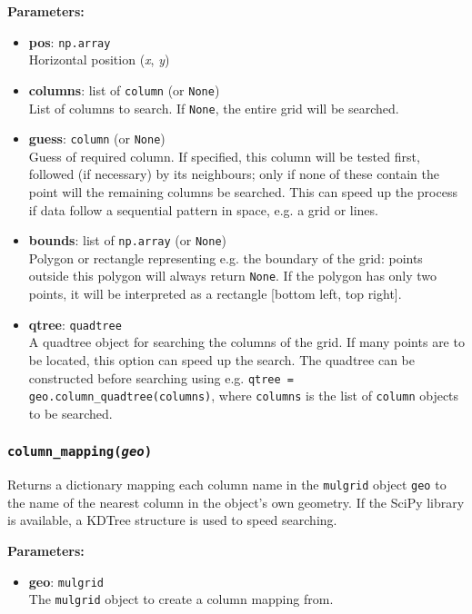 \textbf{Parameters:}
\begin{itemize}
\item \textbf{pos}: \texttt{np.array}\\
  Horizontal position (\emph{x}, \emph{y})
\item \textbf{columns}: list of \texttt{column} (or \texttt{None})\\
  List of columns to search.  If \texttt{None}, the entire grid will be searched.
\item \textbf{guess}: \texttt{column} (or \texttt{None})\\
  Guess of required column.  If specified, this column will be tested first, followed (if necessary) by its neighbours; only if none of these contain the point will the remaining columns be searched.  This can speed up the process if data follow a sequential pattern in space, e.g. a grid or lines.
 \item \textbf{bounds}: list of \texttt{np.array} (or \texttt{None})\\
  Polygon or rectangle representing e.g. the boundary of the grid: points outside this polygon will always return \texttt{None}.  If the polygon has only two points, it will be interpreted as a rectangle [bottom left, top right].
 \item \textbf{qtree}: \texttt{quadtree} \\
   A quadtree object for searching the columns of the grid.  If many points are to be located, this option can speed up the search.  The quadtree can be constructed before searching using e.g. \texttt{qtree = geo.column\_quadtree(columns)}, where \texttt{columns} is the list of \texttt{column} objects to be searched.
\end{itemize}

\subsubsection{\texttt{column\_mapping(\emph{geo})}}

Returns a dictionary mapping each column name in the \texttt{mulgrid} object \texttt{geo} to the name of the nearest column in the object's own geometry.  If the SciPy library is available, a KDTree structure is used to speed searching.

\textbf{Parameters:}
\begin{itemize}
\item \textbf{geo}: \texttt{mulgrid}\\
  The \texttt{mulgrid} object to create a column mapping from.
\end{itemize}

